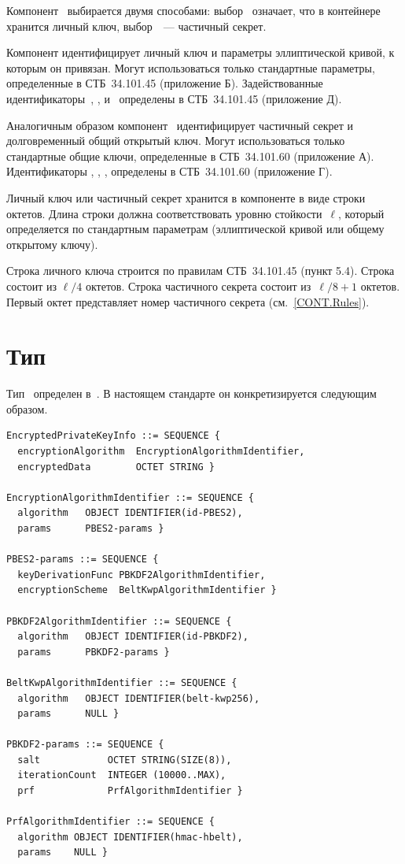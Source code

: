 Компонент~ выбирается двумя способами:
выбор~ означает, что в контейнере хранится личный
ключ, выбор~~--- частичный секрет.

Компонент  идентифицирует личный ключ и параметры
эллиптической кривой, к которым он привязан. Могут использоваться только
стандартные параметры, определенные в СТБ~34.101.45 (приложение Б).
%
Задействованные идентификаторы~, 
,  
и~ определены в СТБ~34.101.45 (приложение Д).

Аналогичным образом компонент~ идентифицирует 
частичный секрет и долговременный общий открытый ключ. 
Могут использоваться только стандартные общие ключи, 
определенные в СТБ~34.101.60 (приложение А). 
Идентификаторы , , 
,  определены в СТБ~34.101.60 
(приложение Г).

Личный ключ или частичный секрет хранится в компоненте  в виде строки
октетов. Длина строки должна соответствовать уровню стойкости~$\ell$, который
определяется по стандартным параметрам (эллиптической кривой или общему
открытому ключу).

Строка личного ключа строится по правилам СТБ~34.101.45 (пункт 5.4). Строка
состоит из $\ell/4$ октетов.
%
Строка частичного секрета состоит из~$\ell/8+1$ октетов. Первый октет
представляет номер частичного секрета (см.~\ref{CONT.Rules}).

\section{Тип }\label{CONT.CT}

Тип~ определен в~\cite{PKCS5}. В настоящем
стандарте он конкретизируется следующим образом.
%
\begin{verbatim}
EncryptedPrivateKeyInfo ::= SEQUENCE {
  encryptionAlgorithm  EncryptionAlgorithmIdentifier,
  encryptedData        OCTET STRING }

EncryptionAlgorithmIdentifier ::= SEQUENCE {
  algorithm   OBJECT IDENTIFIER(id-PBES2),
  params      PBES2-params }

PBES2-params ::= SEQUENCE {
  keyDerivationFunc PBKDF2AlgorithmIdentifier,
  encryptionScheme  BeltKwpAlgorithmIdentifier }

PBKDF2AlgorithmIdentifier ::= SEQUENCE {
  algorithm   OBJECT IDENTIFIER(id-PBKDF2),
  params      PBKDF2-params }

BeltKwpAlgorithmIdentifier ::= SEQUENCE {
  algorithm   OBJECT IDENTIFIER(belt-kwp256),
  params      NULL }

PBKDF2-params ::= SEQUENCE {
  salt            OCTET STRING(SIZE(8)),
  iterationCount  INTEGER (10000..MAX),
  prf             PrfAlgorithmIdentifier }

PrfAlgorithmIdentifier ::= SEQUENCE {
  algorithm OBJECT IDENTIFIER(hmac-hbelt), 
  params    NULL }
\end{verbatim}

